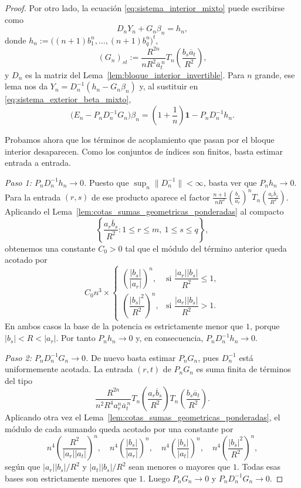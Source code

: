 \begin{proof}
	Por otro lado, la ecuación \eqref{eq:sistema_interior_mixto} puede escribirse como
	\begin{equation}\label{eq:sistema_interior_bloque_mixto}
		D_nY_n+G_n\beta_n=h_n,
	\end{equation}
	donde $h_n:=\bigl((n+1)b_1^n,\dots,(n+1)b_q^n\bigr)^t$,
	\[
		(G_n)_{st}:=\frac{R^{2n}}{nR^2\overline a_t^{\,n}}T_n\!\left(\frac{b_s\overline a_t}{R^2}\right),
	\]
	y $D_n$ es la matriz del Lema~\ref{lem:bloque_interior_invertible}. Para $n$ grande, ese lema nos da $Y_n=D_n^{-1}(h_n-G_n\beta_n)$ y, al sustituir en \eqref{eq:sistema_exterior_beta_mixto},
	\begin{equation}\label{eq:schur_mixto}
		\bigl(E_n-P_nD_n^{-1}G_n\bigr)\beta_n
		=
		\left(1+\frac1n\right)\mathbf 1-P_nD_n^{-1}h_n.
	\end{equation}

	Probamos ahora que los términos de acoplamiento que pasan por el bloque interior desaparecen. Como los conjuntos de índices son finitos, basta estimar entrada a entrada.

	\smallskip
	\noindent\emph{Paso 1: $P_nD_n^{-1}h_n\to0$.}
	Puesto que $\sup_n\|D_n^{-1}\|<\infty$, basta ver que $P_nh_n\to0$. Para la entrada $(r,s)$ de ese producto aparece el factor $\frac{n+1}{nR^2}\left(\frac{b_s}{a_r}\right)^n T_n\!\left(\frac{a_r\overline b_s}{R^2}\right)$.
	Aplicando el Lema~\ref{lem:cotas_sumas_geometricas_ponderadas} al compacto
	\[
		\left\{\frac{a_r\overline b_s}{R^2}:1\le r\le m,\ 1\le s\le q\right\},
	\]
	obtenemos una constante $C_0>0$ tal que el módulo del término anterior queda acotado por
	\[
		C_0n^3\times
		\begin{cases}
			\left(\dfrac{|b_s|}{|a_r|}\right)^n, & \text{si } \dfrac{|a_r||b_s|}{R^2}\le1, \\[1.2ex]
			\left(\dfrac{|b_s|^2}{R^2}\right)^n, & \text{si } \dfrac{|a_r||b_s|}{R^2}>1.
		\end{cases}
	\]
	En ambos casos la base de la potencia es estrictamente menor que $1$, porque $|b_s|<R<|a_r|$. Por tanto $P_nh_n\to0$ y, en consecuencia, $P_nD_n^{-1}h_n\longrightarrow0$.

	\smallskip
	\noindent\emph{Paso 2: $P_nD_n^{-1}G_n\to0$.}
	De nuevo basta estimar $P_nG_n$, pues $D_n^{-1}$ está uniformemente acotada. La entrada $(r,t)$ de $P_nG_n$ es suma finita de términos del tipo
	\[
		\frac{R^{2n}}{n^2R^4a_r^n\overline a_t^{\,n}}T_n\!\left(\frac{a_r\overline b_s}{R^2}\right)T_n\!\left(\frac{b_s\overline a_t}{R^2}\right).
	\]
	Aplicando otra vez el Lema~\ref{lem:cotas_sumas_geometricas_ponderadas}, el módulo de cada sumando queda acotado por una constante por
	\[
		n^4\left(\frac{R^2}{|a_r||a_t|}\right)^n,
		\quad
		n^4\left(\frac{|b_s|}{|a_r|}\right)^n,
		\quad
		n^4\left(\frac{|b_s|}{|a_t|}\right)^n,
		\quad
		n^4\left(\frac{|b_s|^2}{R^2}\right)^n,
	\]
	según que $|a_r||b_s|/R^2$ y $|a_t||b_s|/R^2$ sean menores o mayores que $1$. Todas esas bases son estrictamente menores que $1$. Luego $P_nG_n\longrightarrow0$ y $P_nD_n^{-1}G_n\longrightarrow0$.


\end{proof}
